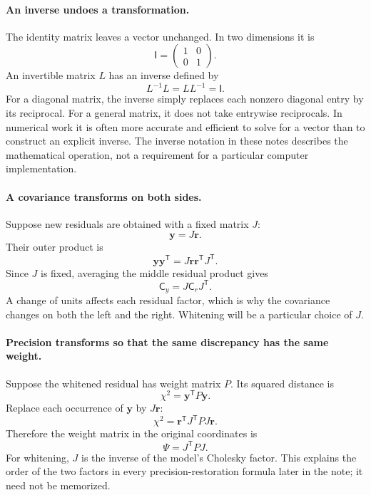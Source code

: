 \documentclass[11pt]{article}
\newcommand{\Cov}{\mathsf{C}}
\newcommand{\I}{\mathsf{I}}
\newcommand{\T}{^{\mathsf{T}}}
\begin{document}
\paragraph{An inverse undoes a transformation.}
The identity matrix leaves a vector unchanged. In two dimensions it is
\begin{equation}
 \I=\begin{pmatrix}1&0\\0&1\end{pmatrix}.
\end{equation}
An invertible matrix $L$ has an inverse defined by
\begin{equation}
 L^{-1}L=LL^{-1}=\I.
\end{equation}
For a diagonal matrix, the inverse simply replaces each nonzero diagonal
entry by its reciprocal. For a general matrix, it does not take entrywise
reciprocals. In numerical work it is often more accurate and efficient
to solve for a vector than to construct an explicit inverse. The inverse
notation in these notes describes the mathematical operation, not a
requirement for a particular computer implementation.

\paragraph{A covariance transforms on both sides.}
Suppose new residuals are obtained with a fixed matrix $J$:
\begin{equation}
 \boldsymbol y=J\boldsymbol r.
\end{equation}
Their outer product is
\begin{equation}
 \boldsymbol y\boldsymbol y\T
       =J\boldsymbol r\boldsymbol r\T J\T.
\end{equation}
Since $J$ is fixed, averaging the middle residual product gives
\begin{equation}
 \Cov_y=J\Cov_r J\T.
\end{equation}
A change of units affects each residual factor, which is why the covariance
changes on both the left and the right. Whitening will be a particular
choice of $J$.

\paragraph{Precision transforms so that the same discrepancy has the same weight.}
Suppose the whitened residual has weight matrix $P$. Its squared distance is
\begin{equation}
 \chi^2=\boldsymbol y\T P\boldsymbol y.
\end{equation}
Replace each occurrence of $\boldsymbol y$ by $J\boldsymbol r$:
\begin{equation}
 \chi^2=\boldsymbol r\T J\T P J\boldsymbol r.
\end{equation}
Therefore the weight matrix in the original coordinates is
\begin{equation}
 \Psi=J\T P J.
\end{equation}
For whitening, $J$ is the inverse of the model's Cholesky factor. This
explains the order of the two factors in every precision-restoration
formula later in the note; it need not be memorized.
\end{document}
